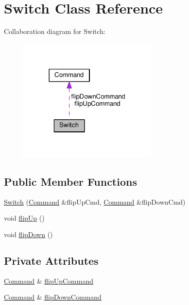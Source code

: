 \hypertarget{classSwitch}{}\section{Switch Class Reference}
\label{classSwitch}


Collaboration diagram for Switch\+:
\nopagebreak
\begin{figure}[H]
\begin{center}
\leavevmode
\includegraphics[width=198pt]{classSwitch__coll__graph}
\end{center}
\end{figure}
\subsection*{Public Member Functions}
\begin{DoxyCompactItemize}
\item 
\hyperlink{classSwitch_a66ba6728853f391a84ac8f9c51e25141}{Switch} (\hyperlink{classCommand}{Command} \&flip\+Up\+Cmd, \hyperlink{classCommand}{Command} \&flip\+Down\+Cmd)
\item 
void \hyperlink{classSwitch_a897907b3d656b36a8bad9a830b294504}{flip\+Up} ()
\item 
void \hyperlink{classSwitch_aa280f6f53ea293f8142f8fa2cd45c3ed}{flip\+Down} ()
\end{DoxyCompactItemize}
\subsection*{Private Attributes}
\begin{DoxyCompactItemize}
\item 
\hyperlink{classCommand}{Command} \& \hyperlink{classSwitch_aa6e2a2d4568aa542ab2e28e5a4da1d3c}{flip\+Up\+Command}
\item 
\hyperlink{classCommand}{Command} \& \hyperlink{classSwitch_af069b11fc4dab647c39da8d09edcf6c5}{flip\+Down\+Command}
\end{DoxyCompactItemize}


